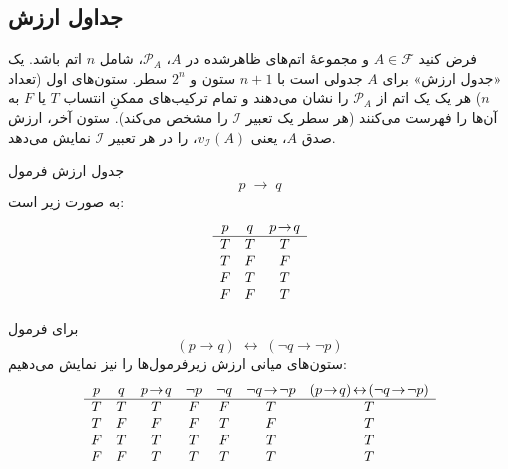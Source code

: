 \subsection*{ جداول ارزش}
    \begin{definition}[تعریف \lr{2.20}]
      فرض کنید $A\in \mathscr{F}$ و مجموعهٔ اتم‌های ظاهرشده در $A$، $\mathscr{P}_{A}$، شامل $n$ اتم باشد.  
      یک «جدول ارزش» برای $A$ جدولی است با $n+1$ ستون و $2^{n}$ سطر.  
      ستون‌های اول (تعداد $n$) هر یک یک اتم از $\mathscr{P}_{A}$ را نشان می‌دهند و تمام ترکیب‌های ممکنِ انتساب $T$ یا $F$ به آن‌ها را فهرست می‌کنند (هر سطر یک تعبیر $\mathscr{I}$ را مشخص می‌کند).  
      ستون آخر، ارزش صدق $A$، یعنی $v_{\mathscr{I}}(A)$، را در هر تعبیر $\mathscr{I}$ نمایش می‌دهد.
    \end{definition}
    \begin{example}[مثال \lr{2.21}]
      جدول ارزش فرمول
      \[
      p \;\rightarrow\; q
      \]
      به صورت زیر است:
      \[
      \begin{array}{c c c}
      p & q & p \!\rightarrow\! q\\
      \hline
      T & T & T\\
      T & F & F\\
      F & T & T\\
      F & F & T
      \end{array}
      \]
    \end{example}
    \begin{example}[مثال \lr{2.22}]
      برای فرمول
      \[
      (p\rightarrow q)\;\leftrightarrow\;(\neg q\rightarrow\neg p)
      \]
      ستون‌های میانی ارزش زیرفرمول‌ها را نیز نمایش می‌دهیم:
      \[
      \begin{array}{c c c c c c c}
      p & q & p\!\rightarrow\!q & \neg p & \neg q & \neg q\!\rightarrow\!\neg p & (p\!\rightarrow\!q)\!\leftrightarrow\!(\neg q\!\rightarrow\!\neg p)\\
      \hline
      T & T & T & F & F & T & T\\
      T & F & F & F & T & F & T\\
      F & T & T & T & F & T & T\\
      F & F & T & T & T & T & T
      \end{array}
      \]
    \end{example}
